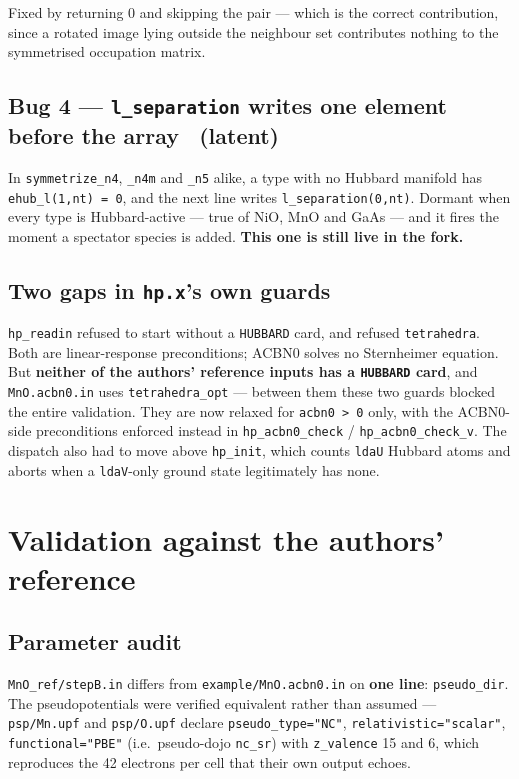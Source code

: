 \documentclass[11pt,a4paper]{article}
\newcommand{\C}[1]{\texttt{\small #1}}
\begin{document}
\noindent
Fixed by returning 0 and skipping the pair --- which is the correct
contribution, since a rotated image lying outside the neighbour set contributes
nothing to the symmetrised occupation matrix.

\subsection*{Bug 4 --- \texttt{l_separation} writes one element before the array \ \textcolor{mute}{(latent)}}

In \C{symmetrize_n4}, \C{_n4m} and \C{_n5} alike, a type with no Hubbard
manifold has \C{ehub_l(1,nt) = 0}, and the next line writes
\C{l_separation(0,nt)}. Dormant when every type is Hubbard-active --- true of
NiO, MnO and GaAs --- and it fires the moment a spectator species is added.
\textbf{This one is still live in the fork.}

\subsection*{Two gaps in \texttt{hp.x}'s own guards}

\C{hp_readin} refused to start without a \C{HUBBARD} card, and refused
\C{tetrahedra}. Both are linear-response preconditions; ACBN0 solves no
Sternheimer equation. But \textbf{neither of the authors' reference inputs has a
\C{HUBBARD} card}, and \C{MnO.acbn0.in} uses \C{tetrahedra_opt} --- between them
these two guards blocked the entire validation. They are now relaxed for
\C{acbn0 > 0} only, with the ACBN0-side preconditions enforced instead in
\C{hp_acbn0_check} / \C{hp_acbn0_check_v}. The dispatch also had to move above
\C{hp_init}, which counts \C{ldaU} Hubbard atoms and aborts when a \C{ldaV}-only
ground state legitimately has none.

\section{Validation against the authors' reference}

\subsection{Parameter audit}

\C{MnO_ref/stepB.in} differs from \C{example/MnO.acbn0.in} on \textbf{one line}:
\C{pseudo_dir}. The pseudopotentials were verified equivalent rather than
assumed --- \C{psp/Mn.upf} and \C{psp/O.upf} declare \C{pseudo_type="NC"},
\C{relativistic="scalar"}, \C{functional="PBE"} (i.e.\ pseudo-dojo \C{nc_sr})
with \C{z_valence} 15 and 6, which reproduces the 42 electrons per cell that
their own output echoes.
\end{document}

